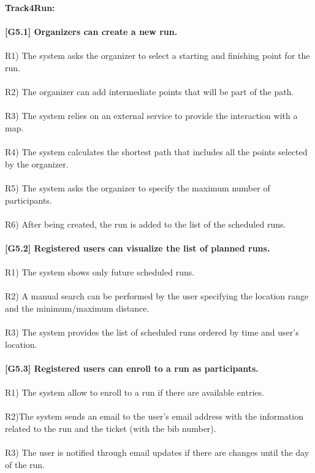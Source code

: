 \textbf{Track4Run:}\\ \\
\textbf{[G5.1] Organizers can create a new run.} \\ \\
R1) The system asks the organizer to select a starting and finishing point for the run. \\ \\
R2) The organizer can add intermediate points that will be part of the path. \\ \\
R3) The system relies on an external service to provide the interaction with a map. \\ \\
R4) The system calculates the shortest path that includes all the points selected by the organizer. \\ \\   
R5) The system asks the organizer to specify the maximum number of participants. \\ \\
R6) After being created, the run is added to the list of the scheduled runs. \\ \\

\textbf{[G5.2] Registered users can visualize the list of planned runs.} \\ \\
R1) The system shows only future scheduled runs. \\ \\ 
R2) A manual search can be performed by the user specifying the location range and the minimum/maximum distance. \\ \\ 
R3) The system provides the list of scheduled runs ordered by time and user’s location. \\ \\

\textbf{[G5.3] Registered users can enroll to a run as participants.} \\ \\
R1) The system allow to enroll to a run if there are available entries. \\ \\
R2)The system sends an email to the user’s email address with the information related to the run and the ticket (with the bib number). \\ \\
R3) The user is notified through email updates if there are changes until the day of the run. \\ \\

